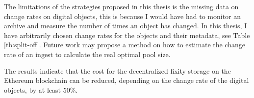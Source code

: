The limitations of the strategies proposed in this thesis is the missing data on change rates on digital objects, this is because I would have had to monitor an archive and measure the number of times an object has changed. In this thesis, I have arbitrarily chosen change rates for the objects and their metadata, see Table \ref{tb:split-off}. Future work may propose a method on how to estimate the change rate of an ingest to calculate the real optimal pool size.

The results indicate that the cost for the decentralized fixity storage on the Ethereum blockchain can be reduced, depending on the change rate of the digital objects, by at least 50\%.